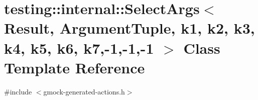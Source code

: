 \hypertarget{classtesting_1_1internal_1_1_select_args_3_01_result_00_01_argument_tuple_00_01k1_00_01k2_00_01k597f472c4e3b394b8bb76f22686b8756}{}\section{testing\+:\+:internal\+:\+:Select\+Args$<$ Result, Argument\+Tuple, k1, k2, k3, k4, k5, k6, k7,-\/1,-\/1,-\/1 $>$ Class Template Reference}
\label{classtesting_1_1internal_1_1_select_args_3_01_result_00_01_argument_tuple_00_01k1_00_01k2_00_01k597f472c4e3b394b8bb76f22686b8756}


{\ttfamily \#include $<$gmock-\/generated-\/actions.\+h$>$}

